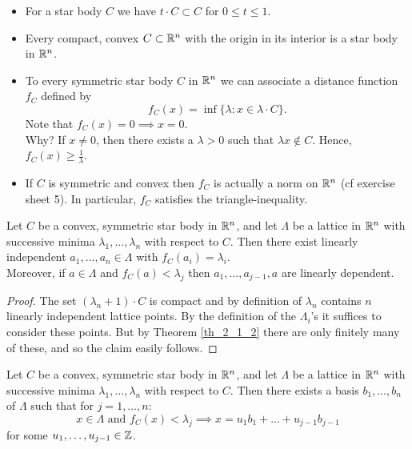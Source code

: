\documentclass[NumTh.tex]{subfiles}
\begin{document}

\begin{rem}
  \begin{itemize}
    \item For a star body $C$ we have $t \cdot C \subset C$ for $0 \leq t \leq 1$.
    \item Every compact, convex $C \subset \mathbb{R}^n$ with the origin in its interior is a star body in $\mathbb{R}^n$.
    \item To every symmetric star body $C$ in $\mathbb{R}^n$ we can associate a distance function $f_C$ defined by
    \[ f_C(x) = \inf \{ \lambda: x \in \lambda \cdot C \} \text{.} \]
    Note that $f_C(x) = 0 \implies x =0$. \\
    Why? If $x \neq 0$, then there exists a $\lambda > 0$ such that $\lambda x \nin C$.
    Hence, $f_C(x) \geq \frac{1}{\lambda}$.
    \item If $C$ is symmetric and convex then $f_C$ is actually a norm on $\mathbb{R}^n$ (cf exercise sheet 5).
    In particular, $f_C$ satisfies the triangle-inequality.
  \end{itemize}
\end{rem}

\begin{lemma}\label{l_2_3_3}
  Let $C$ be a convex, symmetric star body in $\mathbb{R}^n$, and let $\Lambda$ be a lattice in $\mathbb{R}^n$ with successive minima $\lambda_1,\dots,\lambda_n$ with respect to $C$.
  Then there exist linearly independent $a_1,\dots,a_n \in \Lambda$ with $f_C(a_i) =  \lambda_i$.\\
  Moreover, if $a \in \Lambda$ and $f_C(a) < \lambda_j$ then $a_1,\dots,a_{j-1},a$ are linearly dependent.
\end{lemma}

\begin{proof}
  The set $(\lambda_n +1) \cdot C$ is compact and by definition of $\lambda_n$ contains $n$ linearly independent lattice points.
  By the definition of the $\Lambda_i$'s it suffices to consider these points.
  But by Theorem \ref{th_2_1_2} there are only finitely many of these, and so the claim easily follows.
\end{proof}

\begin{cor}\label{cor_2_3_4}
  Let $C$ be a convex, symmetric star body in $\mathbb{R}^n$, and let $\Lambda$ be a lattice in $\mathbb{R}^n$ with successive minima $\lambda_1,\dots,\lambda_n$ with respect to $C$.
  Then there exists a basis $b_1,\dots,b_n$ of $\Lambda$ such that for $j = 1,\dots,n$: 
  \[x \in \Lambda \text{ and } f_C(x) < \lambda_j \implies x = u_1 b_1 + \dots + u_{j-1} b_{j-1} \] 
  for some $u_1,\dots,u_{j-1} \in \mathbb{Z}$.
\end{cor}
\end{document}
